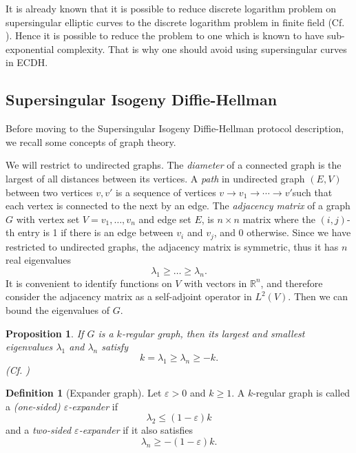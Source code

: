 \documentclass{article}
\theoremstyle{theorem}
\newtheorem{proposition}{Proposition}
\theoremstyle{definition}
\newtheorem{definition}{Definition}
\begin{document}
It is already known that it is possible to reduce discrete logarithm problem on supersingular elliptic curves to the discrete logarithm problem in finite field (Cf. \cite{MOV}). Hence it is possible to reduce the problem to one which is known to have sub-exponential complexity. That is why one should avoid using supersingular curves in ECDH.

\subsection{Supersingular Isogeny Diffie-Hellman}


Before moving to the Supersingular Isogeny Diffie-Hellman protocol description, we recall some concepts of graph theory.

We will restrict to undirected graphs. The \textit{diameter} of a connected graph is the largest of all distances between its vertices. A \textit{path} in undirected graph $(E, V)$ between two vertices $v, v'$ is a sequence of vertices $v \to v_1 \to \cdots \to v'$such that each vertex is connected to the next  by an edge. The \textit{adjacency matrix} of a graph $G$ with vertex set $V = {v_1, \dots, v_n}$ and edge set $E$, is $n \times n$ matrix where the $(i, j)$-th entry is 1 if there is an edge between $v_i$ and $v_j$, and 0 otherwise. Since we have restricted to undirected graphs, the adjacency matrix is symmetric, thus it has $n$ real eigenvalues
	\[ \lambda_1 \geq \dots \geq \lambda_n. \]
It is convenient to identify functions on $V$ with vectors in $\mathbb{R}^n$, and therefore consider the adjacency matrix as a self-adjoint operator in $L^2(V)$. Then we can bound the eigenvalues of $G$.

\begin{proposition}
	If $G$ is a $k$-regular graph, then its largest and smallest eigenvalues $\lambda_1$ and $\lambda_n$ satisfy
		\[ k = \lambda_1 \geq \lambda_n \geq -k. \]
		(Cf. \cite{Tao})
\end{proposition}

\begin{definition}[Expander graph]
	Let $\varepsilon > 0$ and $k \geq 1$. A $k$-regular graph is called a \textit{(one-sided) $\varepsilon$-expander} if
		\[ \lambda_2 \leq (1 - \varepsilon)k \]
	and a \textit{two-sided $\varepsilon$-expander} if it also satisfies
		\[ \lambda_n \geq -(1 - \varepsilon)k. \]
\end{definition}
\end{document}
